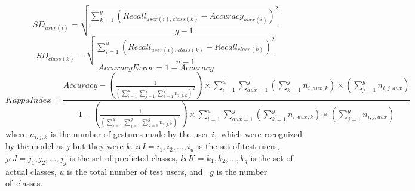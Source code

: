 \documentclass[sensors,review,accept,moreauthors,pdftex]{Definitions/mdpi}
\begin{document}
\begin{equation}\label{eqSDcadauser}
	SD_{user(i)}=\sqrt{\frac{\sum_{k=1}^{g}(Recall_{user(i),class(k)}-Accuracy_{user(i)})^{2}}{g-1}}
\end{equation}
\begin{equation}\label{eqrecallsclass}
	SD_{class(k)}=\sqrt{\frac{\sum_{i=1}^{u}(Recall_{user(i),class(k)}-Recall_{class(k)})^{2}}{u-1}}
\end{equation}
\begin{equation} \label{classError}
AccuracyError=1-Accuracy
\end{equation}
\begin{equation}\label{kappa}
KappaIndex=\frac{Accuracy-(\frac{1}{(\sum_{i=1}^{u}\sum_{j=1}^{g}\sum_{k=1}^{g}n_{i,j,k})^2})\times\sum_{i=1}^{u}\sum_{aux=1}^{g} (\sum_{k=1}^{g}n_{i,aux,k})\times (\sum_{j=1}^{g}n_{i,j,aux})}{1-(\frac{1}{(\sum_{i=1}^{u}\sum_{j=1}^{g}\sum_{k=1}^{g}n_{i,j,k})^2})\times\sum_{i=1}^{u}\sum_{aux=1}^{g}(\sum_{k=1}^{g}n_{i,aux,k})\times (\sum_{j=1}^{g}n_{i,j,aux})}
\end{equation}
where
\begin{math}
n_{i,j,k} 
\end{math}
is the number of gestures made by the user 
\begin{math}
i,
\end{math}
which were recognized by the model as 
\begin{math}
j
\end{math}
but they were 
\begin{math}
k 
\end{math}.
\begin{math}
i \epsilon I=i_1,i_2,...,i_u
\end{math} is the set of test users, 
\begin{math}
j \epsilon J=j_1,j_2,...,j_g
\end{math} is the set of predicted classes, 
\begin{math}
k \epsilon K=k_1,k_2,...,k_g
\end{math} is the set of actual classes, 
\begin{math}
u 
\end{math}
is the total number of test users, and~
\begin{math}
g
\end{math}
is the number of~classes. 
\end{document}
